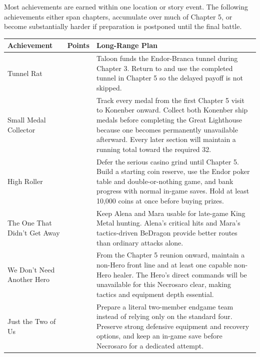 \documentclass[
  american,
  10pt,
  letterpaper,
  oneside,
  open=any]{scrreprt}
\newcounter{none} %
\newenvironment{guidetable}{%
  \small\setstretch{1.0}%
  \setlength{\tabcolsep}{4pt}%
  \setlength{\LTpre}{8pt}\setlength{\LTpost}{10pt}%
  \renewcommand{\arraystretch}{1.16}%
}{ }
\begin{document}
Most achievements are earned within one location or story event. The
following achievements either span chapters, accumulate over much of
Chapter 5, or become substantially harder if preparation is postponed
until the final battle.

\begin{guidetable}

{\def\LTcaptype{none} %
\begin{longtable}[]{@{}
  >{\raggedright\arraybackslash}p{}
  >{\raggedleft\arraybackslash}p{}
  >{\raggedright\arraybackslash}p{}@{}}
\toprule\noalign{}
\begin{minipage}[b]{\linewidth}\raggedright
\color{GuideGreen}\bfseries Achievement
\end{minipage} & \begin{minipage}[b]{\linewidth}\raggedleft
\color{GuideGreen}\bfseries Points
\end{minipage} & \begin{minipage}[b]{\linewidth}\raggedright
\color{GuideGreen}\bfseries Long-Range Plan
\end{minipage} \\
\midrule\noalign{}
\endhead
\bottomrule\noalign{}
\endlastfoot
Tunnel Rat & 5 & Taloon funds the Endor-Branca tunnel during Chapter 3.
Return to and use the completed tunnel in Chapter 5 so the delayed
payoff is not skipped. \\
Small Medal Collector & 50 & Track every medal from the first Chapter 5
visit to Konenber onward. Collect both Konenber ship medals before
completing the Great Lighthouse because one becomes permanently
unavailable afterward. Every later section will maintain a running total
toward the required 32. \\
High Roller & 5 & Defer the serious casino grind until Chapter 5. Build
a starting coin reserve, use the Endor poker table and double-or-nothing
game, and bank progress with normal in-game saves. Hold at least 10,000
coins at once before buying prizes. \\
The One That Didn't Get Away & 5 & Keep Alena and Mara usable for
late-game King Metal hunting. Alena's critical hits and Mara's
tactics-driven BeDragon provide better routes than ordinary attacks
alone. \\
We Don't Need Another Hero & 25 & From the Chapter 5 reunion onward,
maintain a non-Hero front line and at least one capable non-Hero healer.
The Hero's direct commands will be unavailable for this Necrosaro clear,
making tactics and equipment depth essential. \\
Just the Two of Us & 25 & Prepare a literal two-member endgame team
instead of relying only on the standard four. Preserve strong defensive
equipment and recovery options, and keep an in-game save before
Necrosaro for a dedicated attempt. \\
\end{longtable}
}

\end{guidetable}
\end{document}
